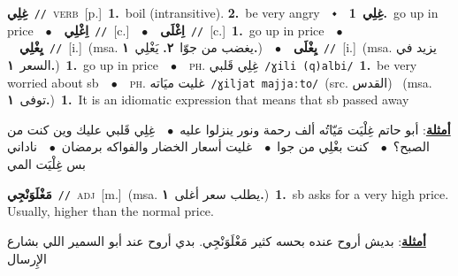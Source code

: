 \documentclass[10pt,a4paper,twoside]{article} %
\begin{document}
\begin{multicols}{2}
{\setlength\topsep{0pt}\textbf{\foreignlanguage{arabic}{غِلِي}}\ {\color{gray}\texttt{//}\color{black}}\ \textsc{verb}\ [p.]\ \textbf{1.}~boil (intransitive).  \textbf{2.}~be very angry\ \ $\smblkdiamond$\ \ \setlength\topsep{0pt}\textbf{\foreignlanguage{arabic}{غِلِي}}\ \textbf{1.}~go up in price\ \ $\bullet$\ \ \setlength\topsep{0pt}\textbf{\foreignlanguage{arabic}{اِغْلِي}}\ {\color{gray}\texttt{//}\color{black}}\ [c.]\ \ $\bullet$\ \ \setlength\topsep{0pt}\textbf{\foreignlanguage{arabic}{اِغْلَى}}\ {\color{gray}\texttt{//}\color{black}}\ [c.]\ \textbf{1.}~go up in price\ \ $\bullet$\ \ \setlength\topsep{0pt}\textbf{\foreignlanguage{arabic}{يِغْلِي}}\ {\color{gray}\texttt{//}\color{black}}\ [i.]\ \color{gray}(msa. \foreignlanguage{arabic}{يغضب من جوّا}~\foreignlanguage{arabic}{\textbf{٢.}}  \foreignlanguage{arabic}{يَغْلِي}~\foreignlanguage{arabic}{\textbf{١.}})\color{black}\ \ $\bullet$\ \ \setlength\topsep{0pt}\textbf{\foreignlanguage{arabic}{يِغْلَى}}\ {\color{gray}\texttt{//}\color{black}}\ [i.]\ \color{gray}(msa. \foreignlanguage{arabic}{يزيد في السعر}~\foreignlanguage{arabic}{\textbf{١.}})\color{black}\ \textbf{1.}~go up in price\ \ $\bullet$\ \ \textsc{ph.} \color{gray} \foreignlanguage{arabic}{غِلِي قَلبي}\color{black}\ {\color{gray}\texttt{/{\sffamily ɣili (q)albi}/}\color{black}}\ \textbf{1.}~be very worried about sb\ \ $\bullet$\ \ \textsc{ph.} \color{gray} \foreignlanguage{arabic}{غليت ميَاته}\color{black}\ {\color{gray}\texttt{/{\sffamily ɣiljat majjaːto}/}\color{black}}\ \color{gray}(src. \foreignlanguage{arabic}{القدس})\color{black}\ \color{gray} (msa. \foreignlanguage{arabic}{توفى}~\foreignlanguage{arabic}{\textbf{١.}})\color{black}\ \textbf{1.}~It is an idiomatic expression that means that sb passed away\  \begin{flushright}\color{gray}\foreignlanguage{arabic}{\textbf{\underline{\foreignlanguage{arabic}{أمثلة}}}: أبو حاتم غِلْيَت مَيّاتُه ألف رحمة ونور ينزلوا عليه\ $\bullet$\ \  غِلِي قَلبي عليك وين كنت من الصبح؟\ $\bullet$\ \  كنت بغْلِي من جوا\ $\bullet$\ \  غليت أسعار الخضار والفواكه برمضان\ $\bullet$\ \  ناداني بس غِلْيَت المي}\end{flushright}\color{black}} \vspace{2mm}

{\setlength\topsep{0pt}\textbf{\foreignlanguage{arabic}{مَغْلَوَنْجِي}}\ {\color{gray}\texttt{//}\color{black}}\ \textsc{adj}\ [m.]\ \color{gray}(msa. \foreignlanguage{arabic}{يطلب سعر أغلى}~\foreignlanguage{arabic}{\textbf{١.}})\color{black}\ \textbf{1.}~sb asks for a very high price. Usually, higher than the normal price.\  \begin{flushright}\color{gray}\foreignlanguage{arabic}{\textbf{\underline{\foreignlanguage{arabic}{أمثلة}}}: بديش أروح عنده بحسه كثير مَغْلَوَنْجِي. بدي أروح عند أبو السمير اللي بشارع الإِرسال}\end{flushright}\color{black}} \vspace{2mm}


\end{multicols}
\end{document}
